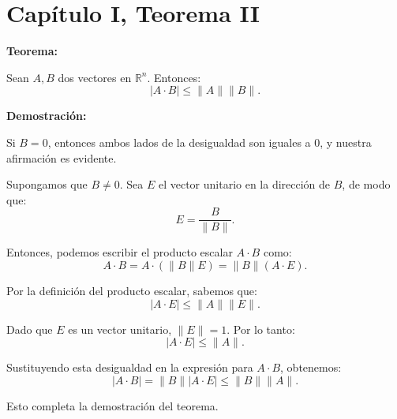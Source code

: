 \section*{Capítulo I, Teorema II}

\textbf{Teorema:}

Sean $A, B$ dos vectores en $\mathbb{R}^n$. Entonces:
\[
    |A \cdot B| \leq \|A\| \|B\|.
\]

\textbf{Demostración:}

Si $B = 0$, entonces ambos lados de la desigualdad son iguales a $0$, y nuestra afirmación es evidente.

Supongamos que $B \neq 0$. Sea $E$ el vector unitario en la dirección de $B$, de modo que:
\[
    E = \frac{B}{\|B\|}.
\]

Entonces, podemos escribir el producto escalar $A \cdot B$ como:
\[
    A \cdot B = A \cdot (\|B\|E) = \|B\| (A \cdot E).
\]

Por la definición del producto escalar, sabemos que:
\[
    |A \cdot E| \leq \|A\| \|E\|.
\]

Dado que $E$ es un vector unitario, $\|E\| = 1$. Por lo tanto:
\[
    |A \cdot E| \leq \|A\|.
\]

Sustituyendo esta desigualdad en la expresión para $A \cdot B$, obtenemos:
\[
    |A \cdot B| = \|B\| |A \cdot E| \leq \|B\| \|A\|.
\]

Esto completa la demostración del teorema. 
